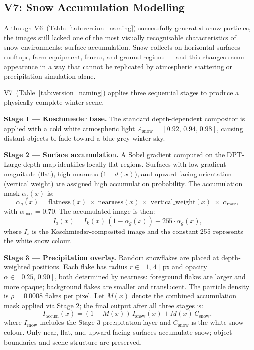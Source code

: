 \FloatBarrier
\subsection{V7: Snow Accumulation Modelling}
\label{sec:v7_accumulation}

\noindent Although V6~(Table~\ref{tab:version_naming}) successfully generated snow particles, the images still lacked one of the most visually recognisable characteristics of snow environments: surface accumulation. Snow collects on horizontal surfaces — rooftops, farm equipment, fences, and ground regions — and this changes scene appearance in a way that cannot be replicated by atmospheric scattering or precipitation simulation alone.

\noindent V7~(Table~\ref{tab:version_naming}) applies three sequential stages to produce a physically complete winter scene.

\textbf{Stage 1 — Koschmieder base.} The standard depth-dependent compositor is applied with a cold white atmospheric light $A_{\text{snow}} = [0.92,\,0.94,\,0.98]$, causing distant objects to fade toward a blue-grey winter sky.

\textbf{Stage 2 — Surface accumulation.} A Sobel gradient computed on the DPT-Large depth map identifies locally flat regions. Surfaces with low gradient magnitude (flat), high nearness ($1-d(x)$), and upward-facing orientation (vertical weight) are assigned high accumulation probability. The accumulation mask $\alpha_g(x)$ is:
\begin{equation}
    \alpha_g(x) = \text{flatness}(x)\;\times\;\text{nearness}(x)\;\times\;\text{vertical\_weight}(x)\;\times\;\alpha_{\max},
\end{equation}
with $\alpha_{\max} = 0.70$. The accumulated image is then:
\begin{equation}
    I_a(x) = I_k(x)\,(1-\alpha_g(x)) + 255\cdot\alpha_g(x),
\end{equation}
where $I_k$ is the Koschmieder-composited image and the constant 255 represents the white snow colour.

\textbf{Stage 3 — Precipitation overlay.} Random snowflakes are placed at depth-weighted positions. Each flake has radius $r \in [1,\,4]$\,px and opacity $\alpha \in [0.25,\,0.90]$, both determined by nearness: foreground flakes are larger and more opaque; background flakes are smaller and translucent. The particle density is $\rho = 0.0008$ flakes per pixel. Let $M(x)$ denote the combined accumulation mask applied via Stage 2; the final output after all three stages is:
\begin{equation}
    I_{\text{accum}}(x) = (1 - M(x))\,I_{\text{snow}}(x) + M(x)\,C_{\text{snow}},
\end{equation}
where $I_{\text{snow}}$ includes the Stage 3 precipitation layer and $C_{\text{snow}}$ is the white snow colour. Only near, flat, and upward-facing surfaces accumulate snow; object boundaries and scene structure are preserved.

